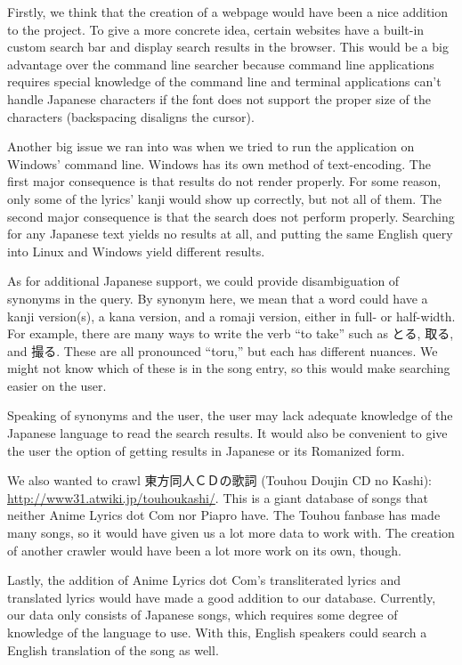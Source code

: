 \documentclass{acm} %
\begin{document}
\begin{CJK}{UTF8}{zhsong}
Firstly, we think that the creation of a webpage would have been a nice addition to the project. To give a more concrete idea, certain websites have a built-in custom search bar and display search results in the browser. This would be a big advantage over the command line searcher because command line applications requires special knowledge of the command line and terminal applications can't handle Japanese characters if the font does not support the proper size of the characters (backspacing disaligns the cursor).

Another big issue we ran into was when we tried to run the application on Windows' command line. Windows has its own method of text-encoding. The first major consequence is that results do not render properly. For some reason, only some of the lyrics' kanji would show up correctly, but not all of them. The second major consequence is that the search does not perform properly. Searching for any Japanese text yields no results at all, and putting the same English query into Linux and Windows yield different results.

As for additional Japanese support, we could provide disambiguation of synonyms in the query. By synonym here, we mean that a word could have a kanji version(s), a kana version, and a romaji version, either in full- or half-width. For example, there are many ways to write the verb ``to take'' such as とる, 取る, and 撮る. These are all pronounced ``toru,'' but each has different nuances. We might not know which of these is in the song entry, so this would make searching easier on the user.

Speaking of synonyms and the user, the user may lack adequate knowledge of the Japanese language to read the search results. It would also be convenient to give the user the option of getting results in Japanese or its Romanized form.

We also wanted to crawl 東方同人ＣＤの歌詞 (Touhou Doujin CD no Kashi): \url{http://www31.atwiki.jp/touhoukashi/}. This is a giant database of songs that neither Anime Lyrics dot Com nor Piapro have. The Touhou fanbase has made many songs, so it would have given us a lot more data to work with. The creation of another crawler would have been a lot more work on its own, though.

Lastly, the addition of Anime Lyrics dot Com's transliterated lyrics and translated lyrics would have made a good addition to our database. Currently, our data only consists of Japanese songs, which requires some degree of knowledge of the language to use. With this, English speakers could search a English translation of the song as well.


\end{CJK}
\end{document}
